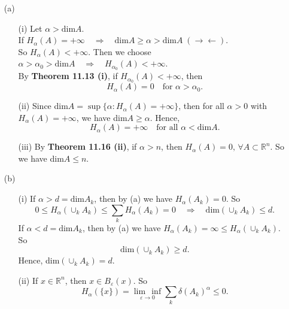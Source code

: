 \documentclass[a4paper,11pt]{article}
\begin{document}
	\begin{enumerate}
		\item[(a)]
			\begin{enumerate}
				\item[(i)]
					Let $\alpha > \text{dim}A$.\\
					If $H_\alpha(A) = +\infty
					\quad \Rightarrow \quad
					\text{dim}A \geq \alpha > \text{dim}A\;(\rightarrow \leftarrow)$.\\
					So $H_\alpha(A) < +\infty$. Then we choose $\alpha > \alpha_0 > \text{dim} A \quad \Rightarrow \quad H_{\alpha_0}(A) < +\infty$.\\
					By \textbf{Theorem 11.13 (i)}, if $H_{\alpha_0}(A) < +\infty$, then
						$$H_\alpha(A) = 0 \quad \text{for } \alpha > \alpha_0.$$

				\item[(ii)]
					Since dim$A = \sup \{\alpha: H_\alpha(A) = +\infty\}$, then for all $\alpha > 0$ with $H_\alpha(A) = +\infty$, we have dim$A \geq \alpha$. Hence,
						$$H_\alpha(A) = +\infty \quad \text{for all } \alpha < \text{dim}A.$$
				\item[(iii)]
					By \textbf{Theorem 11.16 (ii)}, if $\alpha > n$, then $H_\alpha(A) = 0,\,\forall A \subset \mathbb{R}^n$. So we have dim$A \leq n$.\\
			\end{enumerate}

		\item[(b)]
			\begin{enumerate}
				\item[(i)]
					If $\alpha > d = \text{dim} A_k$, then by (a) we have $H_\alpha(A_k) = 0$. So
						$$0 \leq H_\alpha(\cup_k A_k) \leq \sum_k H_\alpha(A_k) = 0
						\quad \Rightarrow \quad
						\text{dim}(\cup_k A_k) \leq d.$$
					If $\alpha < d = \text{dim} A_k$, then by (a) we have $H_\alpha(A_k) = \infty \leq H_\alpha (\cup_k A_k)$. So
						$$\text{dim} (\cup_k A_k) \geq d.$$
					Hence, dim$(\cup_k A_k) = d$.\

				\item[(ii)]
					If $x \in \mathbb{R}^n$, then $x \in B_\varepsilon (x)$. So
						$$H_\alpha(\{x\}) = \underset{\varepsilon \to 0}{\lim\,\inf} \sum_k \delta(A_k)^\alpha \leq 0.$$
			\end{enumerate}
	\end{enumerate}
\end{document}
